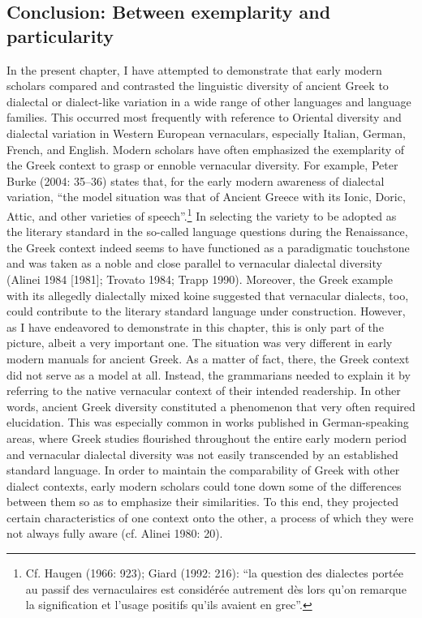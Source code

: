 \subsection{Conclusion: Between exemplarity and particularity}
\hypertarget{Toc19704868}{}\begin{styleStandard}
In the present chapter, I have attempted to demonstrate that early modern scholars compared and contrasted the linguistic diversity of ancient Greek to dialectal or dialect-like variation in a wide range of other languages and language families. This occurred most frequently with reference to Oriental diversity and dialectal variation in Western European vernaculars, especially Italian, German, French, and English. Modern scholars have often emphasized the exemplarity of the Greek context to grasp or ennoble vernacular diversity. For example, Peter Burke (2004: 35–36) states that, for the early modern awareness of dialectal variation, “the model situation was that of Ancient Greece with its Ionic, Doric, Attic, and other varieties of speech”.\footnote{ Cf. Haugen (1966: 923); Giard (1992: 216): “la question des dialectes portée au passif des vernaculaires est considérée autrement dès lors qu’on remarque la signification et l’usage positifs qu’ils avaient en grec”.} In selecting the variety to be adopted as the literary standard in the so-called language questions during the Renaissance, the Greek context indeed seems to have functioned as a paradigmatic touchstone and was taken as a noble and close parallel to vernacular dialectal diversity (Alinei 1984 [1981]; Trovato 1984; Trapp 1990). Moreover, the Greek example with its allegedly dialectally mixed koine suggested that vernacular dialects, too, could contribute to the literary standard language under construction. However, as I have endeavored to demonstrate in this chapter, this is only part of the picture, albeit a very important one. The situation was very different in early modern manuals for ancient Greek. As a matter of fact, there, the Greek context did not serve as a model at all. Instead, the grammarians needed to explain it by referring to the native vernacular context of their intended readership. In other words, ancient Greek diversity constituted a phenomenon that very often required elucidation. This was especially common in works published in German-speaking areas, where Greek studies flourished throughout the entire early modern period and vernacular dialectal diversity was not easily transcended by an established standard language. In order to maintain the comparability of Greek with other dialect contexts, early modern scholars could tone down some of the differences between them so as to emphasize their similarities. To this end, they projected certain characteristics of one context onto the other, a process of which they were not always fully aware (cf. Alinei 1980: 20).
\end{styleStandard}

